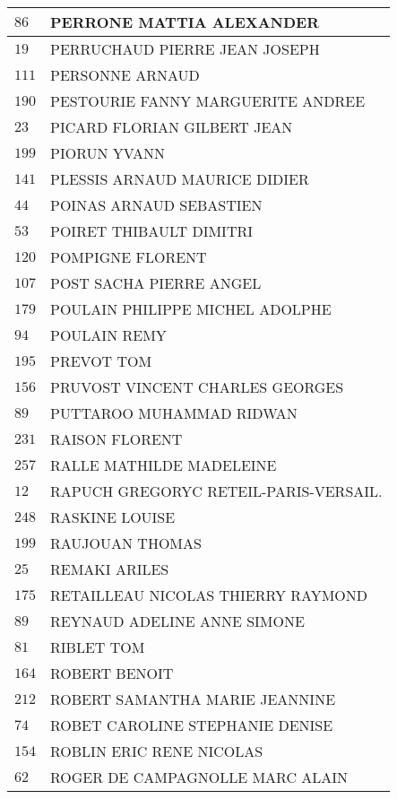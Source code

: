 \begin{xltabular}{\linewidth}{|l|X|}
    \hline
    $86$ & PERRONE MATTIA ALEXANDER \\
    \hline
    $19$ & PERRUCHAUD PIERRE JEAN JOSEPH \\
    \hline
    $111$ & PERSONNE ARNAUD \\
    \hline
    $190$ & PESTOURIE FANNY MARGUERITE ANDREE \\
    \hline
    $23$ & PICARD FLORIAN GILBERT JEAN \\
    \hline
    $199$ & PIORUN YVANN \\
    \hline
    $141$ & PLESSIS ARNAUD MAURICE DIDIER \\
    \hline
    $44$ & POINAS ARNAUD SEBASTIEN \\
    \hline
    $53$ & POIRET THIBAULT DIMITRI \\
    \hline
    $120$ & POMPIGNE FLORENT \\
    \hline
    $107$ & POST SACHA PIERRE ANGEL \\
    \hline
    $179$ & POULAIN PHILIPPE MICHEL ADOLPHE \\
    \hline
    $94$ & POULAIN REMY \\
    \hline
    $195$ & PREVOT TOM \\
    \hline
    $156$ & PRUVOST VINCENT CHARLES GEORGES \\
    \hline
    $89$ & PUTTAROO MUHAMMAD RIDWAN \\
    \hline
    $231$ & RAISON FLORENT \\
    \hline
    $257$ & RALLE MATHILDE MADELEINE \\
    \hline
    $12$ & RAPUCH GREGORYC RETEIL-PARIS-VERSAIL. \\
    \hline
    $248$ & RASKINE LOUISE \\
    \hline
    $199$ & RAUJOUAN THOMAS \\
    \hline
    $25$ & REMAKI ARILES \\
    \hline
    $175$ & RETAILLEAU NICOLAS THIERRY RAYMOND \\
    \hline
    $89$ & REYNAUD ADELINE ANNE SIMONE \\
    \hline
    $81$ & RIBLET TOM \\
    \hline
    $164$ & ROBERT BENOIT \\
    \hline
    $212$ & ROBERT SAMANTHA MARIE JEANNINE \\
    \hline
    $74$ & ROBET CAROLINE STEPHANIE DENISE \\
    \hline
    $154$ & ROBLIN ERIC RENE NICOLAS \\
    \hline
    $62$ & ROGER DE CAMPAGNOLLE MARC ALAIN \\

\end{xltabular}
